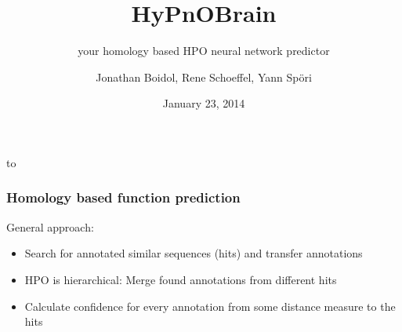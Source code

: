 \documentclass{beamer}
\author{Jonathan Boidol, Rene Schoeffel, Yann Sp\"ori}
\title{HyPnOBrain}
\subtitle{your homology based HPO neural network predictor}
\date{January 23, 2014 }
\begin{document}
{
\usebackgroundtemplate%
{%
    \vbox to 
    
}
 
\begin{frame}
\maketitle
 
\end{frame}
}
\begin{frame}
  \frametitle{Homology based function prediction}
  General approach:
  \begin{itemize}
  	\item Search for annotated similar sequences (hits) and transfer annotations
  	\item HPO is hierarchical: Merge found annotations from different hits
  	\item Calculate confidence for every annotation from some distance measure to the hits
  \end{itemize}

\end{frame}
\end{document}
